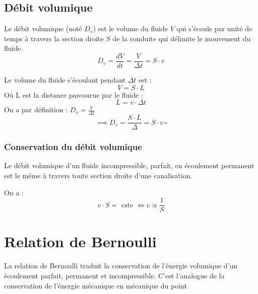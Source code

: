 \subsection{Débit volumique}

\begin{definition}\label{def:Dv}
    Le débit volumique (noté \(D_{v}\)) est le volume du fluide \(V\) qui s'écoule par unité de temps à travers la section droite \(S\) de la conduite qui délimite le mouvement du fluide.
    \[
        D_{v} = \frac{dV}{dt} = \frac{V}{\Delta t} = S \cdot v 
    \] 
\end{definition}

\begin{explanation}
    Le volume du fluide s'écoulant pendant \(\Delta t\) est : 
    \[
        V = S \cdot L
    \]
    Où L est la distance parcourue par le fluide :
    \[
        L = v \cdot \Delta t
    \]
    On a par définition : \(D_{v} = \frac{V}{\Delta t}\)
    \[
        \implies D_{v} = \frac{S \cdot L}{\Delta} = S \cdot v \, \square  
    \]
\end{explanation}

\subsubsection{Conservation du débit volumique}

\begin{theorem}\label{thm:consdebitvol}
    Le débit volumique d'un fluide incompressible, parfait, en écoulement permanent est le même à travers toute section droite d'une canalisation.
\end{theorem}

\begin{corollary}[Conséquence]\label{col:propSV}
    On a : 
    \[
        v \cdot S = \text{ cste } \iff v \propto \frac{1}{S}
    \]
\end{corollary}

\section{Relation de Bernoulli}

\begin{definition}\label{def:relbern}
    La relation de Bernoulli traduit la conservation de l'énergie volumique d'un écoulement parfait, permanent et incompressible. C'est l'analogue de la conservation de l'énergie mécanique en mécanique du point.
\end{definition}

